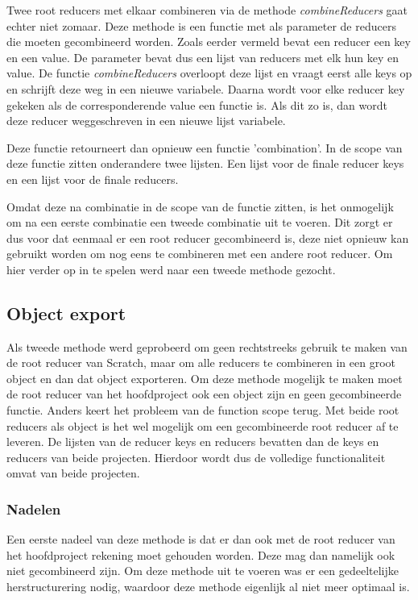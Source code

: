 Twee root reducers met elkaar combineren via de methode \textit{combineReducers} gaat echter niet zomaar. Deze methode is een functie met als parameter de reducers die moeten gecombineerd worden. Zoals eerder vermeld bevat een reducer een key en een value. De parameter bevat dus een lijst van reducers met elk hun key en value. De functie \textit{combineReducers} overloopt deze lijst en vraagt eerst alle keys op en schrijft deze weg in een nieuwe variabele. Daarna wordt voor elke reducer key gekeken als de corresponderende value een functie is. Als dit zo is, dan wordt deze reducer weggeschreven in een nieuwe lijst variabele.   

Deze functie retourneert dan opnieuw een functie 'combination'. In de scope van deze functie zitten onderandere twee lijsten. Een lijst voor de finale reducer keys en een lijst voor de finale reducers. 
 
Omdat deze na combinatie in de scope van de functie zitten, is het onmogelijk om na een eerste combinatie een tweede combinatie uit te voeren. Dit zorgt er dus voor dat eenmaal er een root reducer gecombineerd is, deze niet opnieuw kan gebruikt worden om nog eens te combineren met een andere root reducer. Om hier verder op in te spelen werd naar een tweede methode gezocht. 

\subsection{Object export}
Als tweede methode werd geprobeerd om geen rechtstreeks gebruik te maken van de root reducer van Scratch, maar om alle reducers te combineren in een groot object en dan dat object exporteren. Om deze methode mogelijk te maken moet de root reducer van het hoofdproject ook een object zijn en geen gecombineerde functie. Anders keert het probleem van de function scope terug. Met beide root reducers als object is het wel mogelijk om een gecombineerde root reducer af te leveren. De lijsten van de reducer keys en reducers bevatten dan de keys en reducers van beide projecten. Hierdoor wordt dus de volledige functionaliteit omvat van beide projecten.

\subsubsection{Nadelen}
Een eerste nadeel van deze methode is dat er dan ook met de root reducer van het hoofdproject rekening moet gehouden worden. Deze mag dan namelijk ook niet gecombineerd zijn. Om deze methode uit te voeren was er een gedeeltelijke herstructurering nodig, waardoor deze methode eigenlijk al niet meer optimaal is. 

